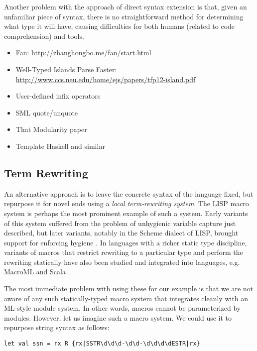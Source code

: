 Another problem with the approach of direct syntax extension is that, given an unfamiliar piece of syntax, there is no straightforward method for determining what type it will have, causing difficulties for both humans (related to code comprehension) and tools. 

\begin{itemize}
\item Fan: http://zhanghongbo.me/fan/start.html
\item Well-Typed Islands Parse Faster: \\\url{http://www.ccs.neu.edu/home/ejs/papers/tfp12-island.pdf}
\item User-defined infix operators
\item SML quote/unquote 
\item That Modularity paper
\item Template Haskell and similar
\end{itemize}
\subsection{Term Rewriting}\label{sec:term-rewriting}
An alternative approach is to leave the concrete syntax of the language fixed, but repurpose it for novel ends using a \emph{local term-rewriting system}. The LISP macro system \cite{Hart63a} is perhaps the most prominent example of such a system. Early variants of this system suffered from the problem of unhygienic variable capture just described, but  later variants, notably in the Scheme dialect of LISP, brought support for enforcing hygiene \cite{Kohlbecker86a}. In languages with a richer static type discipline, variants of macros that restrict rewriting to a particular type and perform the rewriting statically have also been studied \cite{Herman10:Theory,ganz2001macros} and integrated into languages, e.g. MacroML \cite{ganz2001macros} and Scala \cite{ScalaMacros2013}. 

The most immediate problem with using these for our example is that we are not aware of any such statically-typed macro system that integrates cleanly with an ML-style module system. In other words, macros cannot be parameterized by modules. However, let us imagine such a macro system. We could use it to repurpose string syntax  as follows:
\begin{lstlisting}[numbers=none]
let val ssn = rx R {rx|SSTR\d\d\d-\d\d-\d\d\d\dESTR|rx}
\end{lstlisting}

